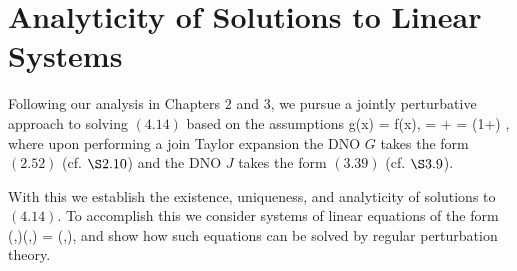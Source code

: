 \section{Analyticity of Solutions to Linear Systems}
\label{Sec:Analyticity of solutions}
Following our analysis in Chapters $2$ and $3$, we pursue a jointly
perturbative approach to solving $(4.14)$ based on the assumptions
\bes
g(x) = \Eps f(x),
\quad
\omega = \uomega + \delta \uomega = (1+\delta) \uomega,\ees
where upon performing a join Taylor expansion the DNO $G$ takes the form $(2.52)$ (cf. $\S2.10$) and the DNO $J$ takes the form $(3.39)$ (cf. $\S3.9$).
\bigskip


With this we establish the existence,
uniqueness, and analyticity of solutions to $(4.14)$. To accomplish this we consider systems of linear equations of the form
\be
\label{Eqn:Linear_System:Two_Param}
\bA(\Eps,\delta)\bV(\Eps,\delta) = \bR(\Eps,\delta),
\ee
and show how such equations can be solved by regular perturbation theory.